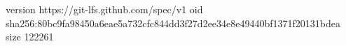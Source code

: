 version https://git-lfs.github.com/spec/v1
oid sha256:80bc9fa98450a6eae5a732cfc844dd3f27d2ee34e8e49440bf1371f20131bdea
size 122261
